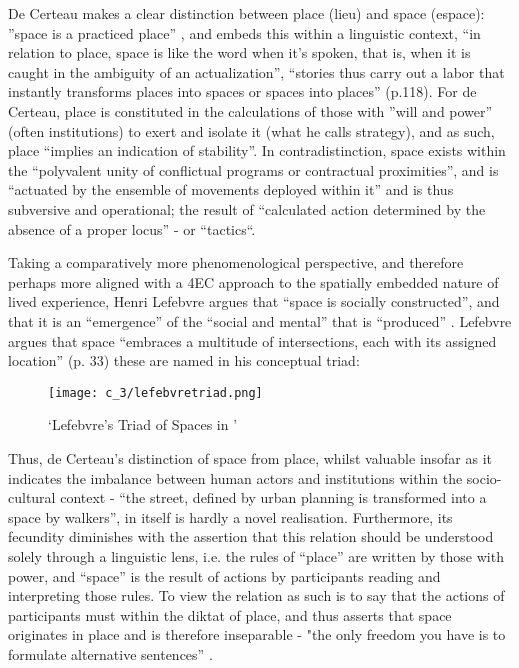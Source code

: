 De Certeau makes a clear distinction between place (lieu) and space (espace): ”space is a practiced place”  \citeyearpar[p. 117]{decerteau1984}, and embeds this within a linguistic context, “in relation to place, space is like the word when it’s spoken, that is, when it is caught in the ambiguity of an actualization”, “stories thus carry out a labor that instantly transforms places into spaces or spaces into places” (p.118). For de Certeau, place is constituted in the calculations of those with ”will and power” (often institutions) to exert and isolate it (what he calls strategy), and as such, place “implies an indication of stability”. In contradistinction, space exists within the “polyvalent unity of conflictual programs or contractual proximities”, and is “actuated by the ensemble of movements deployed within it” and is thus subversive and operational; the result of “calculated action determined by the absence of a proper locus” - or “tactics“. 

Taking a comparatively more phenomenological perspective, and therefore perhaps more aligned with a 4EC approach to the spatially embedded nature of lived experience, Henri Lefebvre argues that “space is socially constructed”, and that it is an “emergence” of the “social and mental” that is “produced”  \citeyearpar[p. 260]{lefebvre1991}. Lefebvre argues that space “embraces a multitude of intersections, each with its assigned location” (p. 33) these are named in his conceptual triad:

\begin{figure}[bth]
    \myfloatalign
    {\texttt{[image: c\_3/lefebvretriad.png]}}
    \caption[`Lefebvre's Triad of Spaces in (Günzel, 2019, p.14)']{`Lefebvre's Triad of Spaces in \citep[p. 14]{gunzel2019a}'}\label{fig:lefebvretriad}
\end{figure}

Thus, de Certeau's distinction of space from place, whilst valuable insofar as it indicates the imbalance between human actors and institutions within the socio-cultural context - “the street, defined by urban planning is transformed into a space by walkers”, in itself is hardly a novel realisation. Furthermore, its fecundity diminishes with the assertion that this relation should be understood solely through a linguistic lens, i.e. the rules of “place” are written by those with power, and “space” is the result of actions by participants reading and interpreting those rules. To view the relation as such is to say that the actions of participants must within the diktat of place, and thus asserts that space originates in place and is therefore inseparable - "the only freedom you have is to formulate alternative sentences” \citep{vermeulen2015}. 

